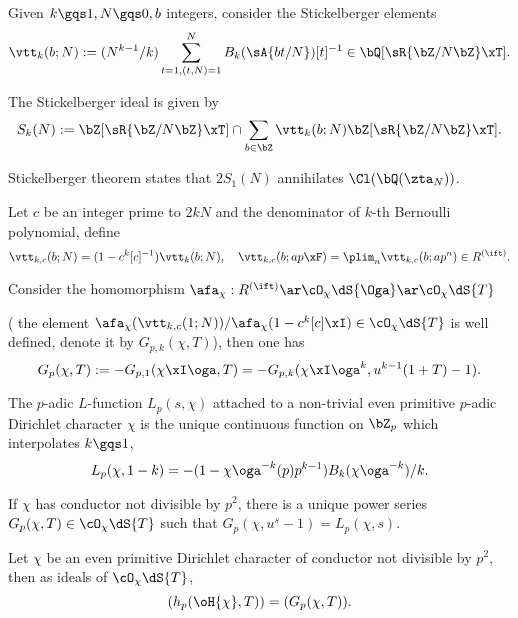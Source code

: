 \documentclass[article, a4paper, twoside]{universal}
\begin{document}
\begin{cmt}
	\begin{dfn}
		Given $k\gqs1,N\gqs0,b$ integers, consider the Stickelberger elements
		\[
			\vtt_{k}(b;N):=(N^{k-1}/k)\sum_{t=1,(t,N)=1}^{N}B_{k}(\sA{bt/N})[t]^{-1}\in\bQ[\sR{\bZ/N\bZ}\xT].
		\]

		The Stickelberger ideal is given by
		\[
			S_{k}(N):=\bZ[\sR{\bZ/N\bZ}\xT]\cap\sum_{b\in\bZ}\vtt_{k}(b;N)\bZ[\sR{\bZ/N\bZ}\xT].
		\]

		Stickelberger theorem states that $2S_{1}(N)$ annihilates $\Cl(\bQ(\zta_{N}))$.

		Let $c$ be an integer prime to $2kN$ and the denominator of $k$-th Bernoulli polynomial, define
		\[
			\vtt_{k,c}(b; N)=(1-c^{k}[c]^{-1})\vtt_{k}(b;N),\quad \vtt_{k,c}(b;ap\xF)=\plim_{n}\vtt_{k,c}(b;ap^{n})\in R^{(\ift)}.
		\]

		Consider the homomorphism $\afa_{\chi}:R^{(\ift)}\ar\cO_{\chi}\dS{\Oga}\ar\cO_{\chi}\dS{T}$

			( the element $\afa_{\chi}(\vtt_{k,c}(1;N))/\afa_{\chi}(1-c^{k}[c]\xI)\in\cO_{\chi}\dS{T}$ is well defined, denote it by $G_{p,k}(\chi,T)$), then one has
			\[
				G_{p}(\chi,T):=-G_{p,1}(\chi\xI\oga,T)=-G_{p,k}(\chi\xI\oga^{k},u^{k-1}(1+T)-1).
			\]
	\end{dfn}

	\begin{dfn}
		The $p$-adic $L$-function $L_{p}(s,\chi)$ attached to a non-trivial even primitive $p$-adic Dirichlet character $\chi$ is the unique continuous function on $\bZ_{p}$ which interpolates $k\gqs1$,
		\[
			L_{p}(\chi,1-k)=-(1-\chi\oga^{-k}(p)p^{k-1})B_{k}(\chi\oga^{-k})/k.
		\]

		If $\chi$ has conductor not divisible by $p^{2}$, there is a unique power series $G_{p}(\chi,T)\in\cO_{\chi}\dS{T}$ such that $G_{p}(\chi,u^{s}-1)=L_{p}(\chi,s)$.
	\end{dfn}


	\begin{cnj}
		Let $\chi$ be an even primitive Dirichlet character of conductor not divisible by $p^{2}$, then as ideals of $\cO_{\chi}\dS{T}$,
		\[
			(h_{p}(\oH{\chi},T))=(G_{p}(\chi,T)).
		\]
	\end{cnj}
\end{cmt}
\end{document}
